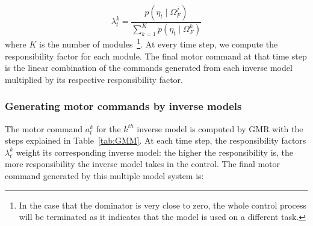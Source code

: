 \begin{equation}
\lambda^k_t = \frac{p(\eta_t {\mid} \Omega_F^j)}{\sum_{k=1}^{K}{p(\eta_t {\mid} \Omega_F^k)}}
\end{equation}
where $K$ is the number of modules~\footnote{In the case that the
  dominator is very close to zero, the whole control process will be
  terminated as it indicates that the model is used on a different
  task.}.  At every time step, we compute the responsibility factor
for each module. The final motor command at that time step is the
linear combination of the commands generated from each inverse model
multiplied by its respective responsibility factor.


\subsubsection{Generating motor commands by inverse models}
\label{sec:inverse}

The motor command $a^k_t$ for the $k^{th}$ inverse model is computed
by GMR with the steps explained in Table~\ref{tab:GMM}. At each time
step, the responsibility factors $\lambda^k_t$ weight its
corresponding inverse model: the higher the responsibility is, the
more responsibility the inverse model takes in the control. The final
motor command generated by this multiple model system is:


